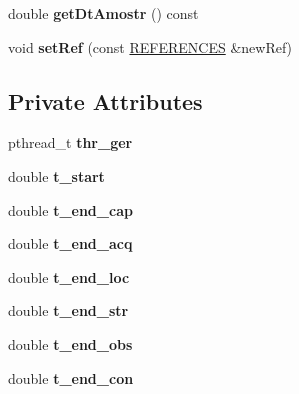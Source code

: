 \begin{DoxyCompactItemize}
\item 
double {\bfseries get\+Dt\+Amostr} () const \hypertarget{classFutrobot_a1c299830c67017ea11e6d0b13573ff58}{}\label{classFutrobot_a1c299830c67017ea11e6d0b13573ff58}

\item 
void {\bfseries set\+Ref} (const \hyperlink{structREFERENCES}{R\+E\+F\+E\+R\+E\+N\+C\+ES} \&new\+Ref)\hypertarget{classFutrobot_a439e83566bea6fa600fea840add4abc4}{}\label{classFutrobot_a439e83566bea6fa600fea840add4abc4}

\end{DoxyCompactItemize}
\subsection*{Private Attributes}
\begin{DoxyCompactItemize}
\item 
pthread\+\_\+t {\bfseries thr\+\_\+ger}\hypertarget{classFutrobot_ad1c1a05d3b901004badbaec63b8c1317}{}\label{classFutrobot_ad1c1a05d3b901004badbaec63b8c1317}

\item 
double {\bfseries t\+\_\+start}\hypertarget{classFutrobot_a61e473896c886a913e9cded1372cf018}{}\label{classFutrobot_a61e473896c886a913e9cded1372cf018}

\item 
double {\bfseries t\+\_\+end\+\_\+cap}\hypertarget{classFutrobot_afa701d8e2d395a702b085dd23c78a26a}{}\label{classFutrobot_afa701d8e2d395a702b085dd23c78a26a}

\item 
double {\bfseries t\+\_\+end\+\_\+acq}\hypertarget{classFutrobot_af4a44db508cb8492be2c3bbc0347f504}{}\label{classFutrobot_af4a44db508cb8492be2c3bbc0347f504}

\item 
double {\bfseries t\+\_\+end\+\_\+loc}\hypertarget{classFutrobot_aeefd73b563512d24aeef4592a50d8314}{}\label{classFutrobot_aeefd73b563512d24aeef4592a50d8314}

\item 
double {\bfseries t\+\_\+end\+\_\+str}\hypertarget{classFutrobot_a0f1b593cb3fc2eb4331c95a07ae5b89e}{}\label{classFutrobot_a0f1b593cb3fc2eb4331c95a07ae5b89e}

\item 
double {\bfseries t\+\_\+end\+\_\+obs}\hypertarget{classFutrobot_a5aa7146438c1fd74b36e0dd0163a2122}{}\label{classFutrobot_a5aa7146438c1fd74b36e0dd0163a2122}

\item 
double {\bfseries t\+\_\+end\+\_\+con}\hypertarget{classFutrobot_aec36dc2254e3e80c20f7c174dfaf8c08}{}\label{classFutrobot_aec36dc2254e3e80c20f7c174dfaf8c08}


\end{DoxyCompactItemize}
